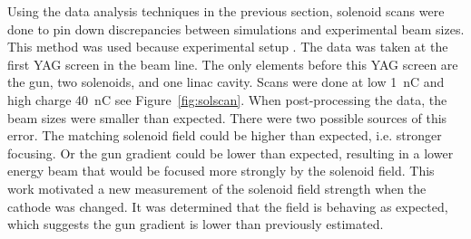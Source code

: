 Using the data analysis techniques in the previous section, 
solenoid scans were done to pin down discrepancies between 
simulations and experimental beam sizes. 
This method was used because  experimental 
setup .
The data was taken at the first YAG screen in the beam line.
The only elements before this YAG screen are the gun, two solenoids, 
and one linac cavity. 
Scans were done at low  \SI{1}{nC} \lsnote{\sout{,} )} and high charge \lsnote{\sout{,} (} \SI{40}{nC} \lsnote{\sout{,} )} see Figure~\ref{fig:solscan}. 
When post-processing the data, the beam sizes were smaller than expected.
There were two possible sources of this error. 
The matching solenoid field could be higher than expected, i.e. stronger focusing.
Or the gun gradient could be lower than expected, resulting in a lower energy 
beam that would be focused more strongly by the solenoid field.
This work motivated a new measurement of the solenoid field strength when 
the cathode was changed. It was determined that the field is behaving as expected, 
which suggests the gun gradient is lower than previously estimated.
